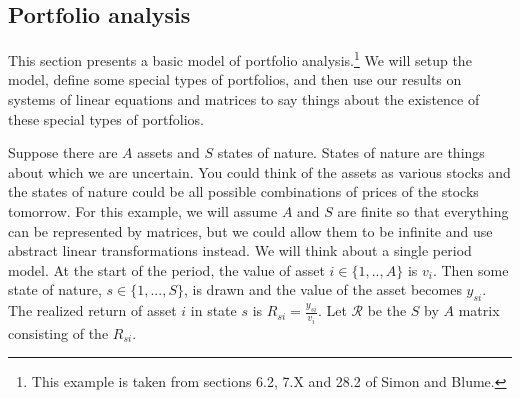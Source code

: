 \documentclass[12pt,reqno]{amsart}
\theoremstyle{definition}
\begin{document}
\subsection{Portfolio analysis}

This section presents a basic model of portfolio
analysis.\footnote{This example is taken from sections 6.2, 7.X and
  28.2 of Simon and Blume.} We will setup the model, define some
special types of portfolios, and then use our results on systems of
linear equations and matrices to say things about the existence of
these special types of portfolios. 

Suppose there are $A$ assets and $S$ states of nature. States of
nature are things about which we are uncertain. You could think of the
assets as various stocks and the states of nature could be all
possible combinations of prices of the stocks tomorrow. For this
example, we will assume $A$ and $S$ are finite so that everything can
be represented by matrices, but we could allow them to be infinite and
use abstract linear transformations instead.  We will think about a
single period model. At the start of the period, the value of asset $i
\in \{1,..,A\}$ is $v_i$. Then some state of nature, $s \in \{1, ...,
S\}$, is drawn and the value of the asset becomes $y_{si}$. The
realized return of asset $i$ in state $s$ is $R_{si} =
\frac{y_{si}}{v_i}$. Let $\mathcal{R}$ be the $S$ by $A$ matrix
consisting of the $R_{si}$.
\end{document}
